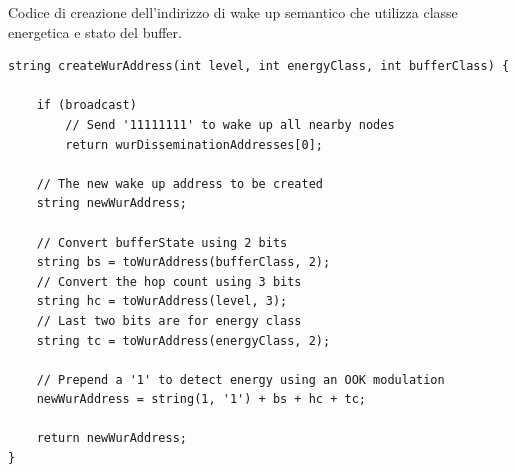 \documentclass[binding=0.6cm,TFA]{sapthesis}
\begin{document}
\begin{listing}[h]
    \caption{Codice di creazione dell'indirizzo di wake up semantico che utilizza classe energetica e stato del buffer.}
    \begin{verbatim}
string createWurAddress(int level, int energyClass, int bufferClass) {

    if (broadcast)
        // Send '11111111' to wake up all nearby nodes
        return wurDisseminationAddresses[0];

    // The new wake up address to be created
    string newWurAddress;

    // Convert bufferState using 2 bits
    string bs = toWurAddress(bufferClass, 2);
    // Convert the hop count using 3 bits
    string hc = toWurAddress(level, 3);
    // Last two bits are for energy class
    string tc = toWurAddress(energyClass, 2);

    // Prepend a '1' to detect energy using an OOK modulation
    newWurAddress = string(1, '1') + bs + hc + tc;

    return newWurAddress;
}

    \end{verbatim}
\end{listing}
\end{document}
